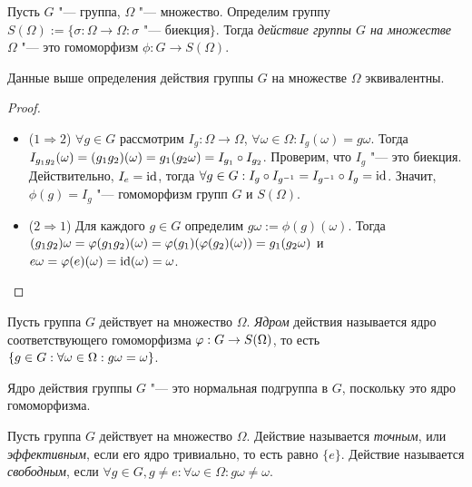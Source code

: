 \begin{definition}
	Пусть $G$ "--- группа, $\Omega$ "--- множество. Определим группу $S(\Omega) := \{\sigma: \Omega \to \Omega: \sigma\text{ "--- биекция}\}$. Тогда \textit{действие группы $G$ на множестве $\Omega$} "--- это гомоморфизм $\phi: G \to S(\Omega)$.
\end{definition}

\begin{proposition}
	Данные выше определения действия группы $G$ на множестве $\Omega$ эквивалентны.
\end{proposition}

\begin{proof}~
	\begin{itemize}
		\item ($1 \Rightarrow 2$) $\forall g \in G$ рассмотрим $I_g: \Omega \to \Omega$, $\forall \omega \in \Omega: I_g(\omega) = g\omega$. Тогда $I_{g_1g_2}(\omega) \hm= (g_1g_2)(\omega) = g_1(g_2\omega) = I_{g_1}\circ I_{g_2}$. Проверим, что $I_g$ "--- это биекция. Действительно, $I_e = \operatorname{id}$, тогда $\forall g \in G: I_g\circ I_{g^{-1}} = I_{g^{-1}}\circ I_g = \operatorname{id}$. Значит, $\phi(g) = I_g$ "--- гомоморфизм групп $G$ и $S(\Omega)$.
		\item($2 \Rightarrow 1$) Для каждого $g \in G$ определим $g\omega := \phi(g)(\omega)$. Тогда $(g_1g_2)\omega = \phi(g_1g_2)(\omega) \hm= \phi(g_1)(\phi(g_2)(\omega)) = g_1(g_2\omega)$ и $e\omega \hm= \phi(e)(\omega) = \id(\omega) = \omega$.
	\end{itemize}
\end{proof}

\begin{definition}
	Пусть группа $G$ действует на множество $\Omega$. \textit{Ядром} действия называется ядро соответствующего гомоморфизма $\phi: G \hm\to S(\Omega)$, то есть $\{g \in G: \forall \omega \in \Omega: g\omega \hm= \omega\}$.
\end{definition}

\begin{note}
	Ядро действия группы $G$ "--- это нормальная подгруппа в $G$, поскольку это ядро гомоморфизма.
\end{note}

\begin{definition}
	Пусть группа $G$ действует на множество $\Omega$. Действие называется \textit{точным}, или \textit{эффективным}, если его ядро тривиально, то есть равно $\{e\}$. Действие называется \textit{свободным}, если $\forall g \in G, g\ne e: \forall \omega \in \Omega: g\omega \ne \omega$.
\end{definition}

